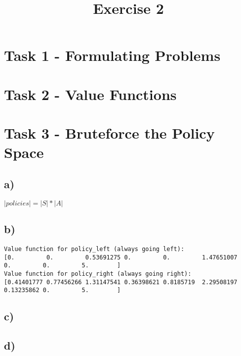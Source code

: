 \documentclass[a4paper]{article}
\date{}
\author{}
\title{\textbf{Exercise 2}}
\begin{document}
\maketitle 
\thispagestyle{fancy}

\section*{Task 1 - Formulating Problems}

\section*{Task 2 - Value Functions}

\section*{Task 3 - Bruteforce the Policy Space}
\subsection*{a)}
$ |policies|  =  |S| * |A| $
\subsection*{b)}

\begin{lstlisting}
Value function for policy_left (always going left):
[0.         0.         0.53691275 0.         0.         1.47651007
0.         0.         5.        ]
Value function for policy_right (always going right):
[0.41401777 0.77456266 1.31147541 0.36398621 0.8185719  2.29508197
0.13235862 0.         5.        ]
\end{lstlisting}

\subsection*{c)}


\subsection*{d)}
\end{document}

